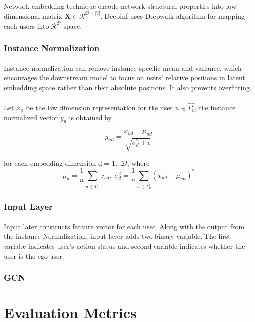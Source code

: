 \paragraph{} Network embedding technique encode network structural properties into low dimensional matrix $\mathbf{X} \in
\mathcal{R}^{\mathcal{D} \times |V|}$. Deepinf uses Deepwalk algorithm for mapping each users into $\mathcal{R}^{\mathcal{D}}$
space.


\subsubsection{Instance Normalization}

\paragraph{} Instance normalization can remove instance-specific mean and variance, which encourages the downstream model 
to focus on users’ relative positions in latent embedding space rather than their absolute positions. It also prevents 
overfitting.

\paragraph{} Let $x_u$ be the low dimension representation for the user $u \in \hat{\Gamma_v^r}$, the instance normalized
vector $y_u$ is obtained by

\begin{equation}
    y_{ud} = \frac{x_{ud}-\mu_{ud}}{\sqrt{\sigma_d^2+\epsilon}}
\end{equation}

for each embedding dimension d = 1...$\mathcal{D}$, where 
\begin{equation}
    \mu_d = \frac{1}{n}\sum_{u \in \hat{\Gamma_v^r}}x_{ud},\ \sigma_d^2 = \frac{1}{n}\sum_{u \in \hat{\Gamma_v^r}}(x_{ud}-\mu_{ud})^2
\end{equation}


\subsubsection{Input Layer}

\paragraph{} Input later constructs feature vector for each user. Along with the output from the instance Normalization,
input layer adds two binary variable. The first variabe indicates user's action status and second variable indicates whether
the user is the ego user.
\subsubsection{GCN}
\section{Evaluation Metrics}